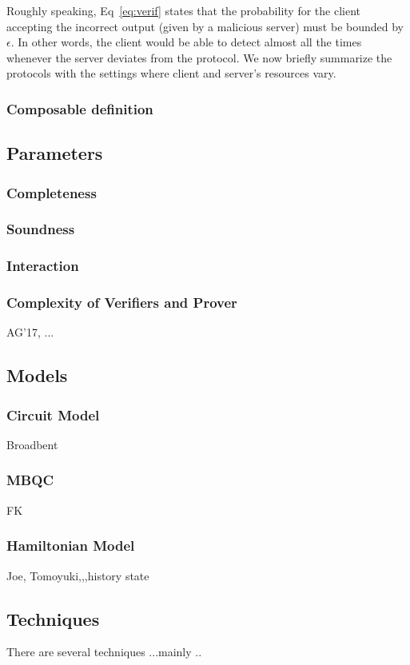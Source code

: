 Roughly speaking, Eq~\eqref{eq:verif} states that the probability for the client accepting the incorrect output (given by a malicious server) must be bounded by $\epsilon$. In other words, the client would be able to detect almost all the times whenever the server deviates from the protocol. We now briefly summarize the protocols with the settings where client and server's resources vary.

\subsubsection{Composable definition}

\subsection{Parameters}
\subsubsection{Completeness}
\subsubsection{Soundness}
\subsubsection{Interaction}
\subsubsection{Complexity of Verifiers and Prover}
AG'17, ...



\subsection{Models}
\subsubsection{Circuit Model}
Broadbent
\subsubsection{MBQC}
FK
\subsubsection{Hamiltonian Model}
Joe, Tomoyuki,,,history state


\subsection{Techniques}
There are several techniques ...mainly ..
